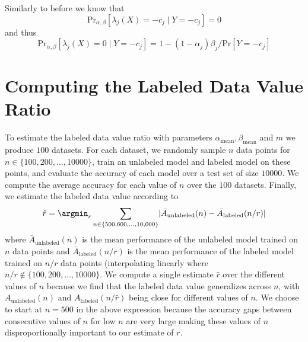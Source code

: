 Similarly to before we know that
\begin{equation*}
    \text{Pr}_{\alpha,\beta}[\lambda_j(X)=-c_j\mid Y=-c_j]=0
\end{equation*}
and thus
\begin{equation*}
    \text{Pr}_{\alpha,\beta}[\lambda_j(X)=0\mid Y=-c_j]=1-(1-\alpha_j)\beta_j/\text{Pr}[Y=-c_j]
\end{equation*}

\section{Computing the Labeled Data Value Ratio}
\label{appendix:ldvr_computation}

To estimate the labeled data value ratio with parameters $\alpha_\text{mean},\beta_\text{mean}$ and $m$ we produce $100$ datasets. For each dataset, we randomly sample $n$ data points for $n\in\{100, 200, \hdots,10000\}$, train an unlabeled model and labeled model on these points, and evaluate the accuracy of each model over a test set of size $10000$. We compute the average accuracy for each value of $n$ over the $100$ datasets. Finally, we estimate the labeled data value according to
\begin{equation}
    \hat{r}=\argmin_r\sum_{n\in\{500,600,\hdots,10,000\}}\lvert \bar{A}_\text{unlabeled}(n)-\bar{A}_\text{labeled}(n/r)\rvert
\end{equation}
where $\bar{A}_\text{unlabeled}(n)$ is the mean performance of the unlabeled model trained on $n$ data points and $\bar{A}_\text{labeled}(n/r)$ is the mean performance of the labeled model trained on $n/r$ data points (interpolating linearly where $n/r\notin\{100,200,\hdots,10000\}$. We compute a single estimate $\hat{r}$ over the different values of $n$ because we find that the labeled data value generalizes across $n$, with $A_\text{unlabeled}(n)$ and $A_\text{labeled}(n/\hat{r})$ being close for different values of $n$. We choose to start at $n=500$ in the above expression because the accuracy gaps between consecutive values of $n$ for low $n$ are very large making these values of $n$ disproportionally important to our estimate of $r$.
